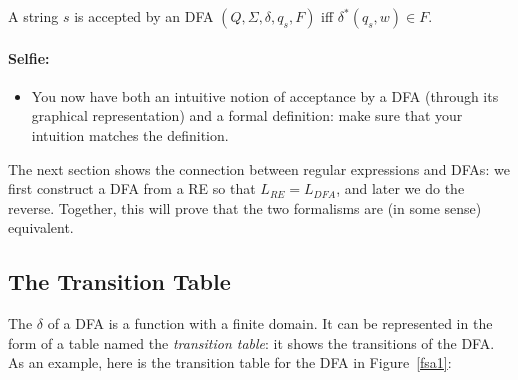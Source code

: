 \begin{definition} \label{defacceptdfa}
A string $s$ is accepted by an DFA
$(Q,\Sigma,\delta,q_s,F)$ iff $\delta^*(q_s,w) \in F$.
\end{definition}

\paragraph{Selfie:}
\begin{itemize}
\item[]
You now have both an intuitive notion of acceptance by a DFA (through
its graphical representation) and a formal definition: make sure that
your intuition matches the definition.
\end{itemize}



The next section shows the connection between regular expressions and
DFAs: we first construct a DFA from a RE so that $L_{RE} = L_{DFA}$,
and later we do the reverse. Together, this will prove that the two
formalisms are (in some sense) equivalent.


\subsection*{The Transition Table}

The $\delta$ of a DFA is a function with a finite domain. It can be
represented in the form of a table named the {\em transition table}:
it shows the transitions of the DFA. As an example,
here is the transition table for the DFA in Figure~\ref{fsa1}:

